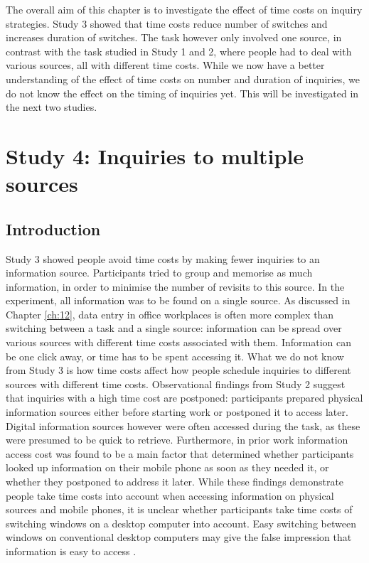 The overall aim of this chapter is to investigate the effect of time costs on inquiry strategies. Study 3 showed that time costs reduce number of switches and increases duration of switches. The task however only involved one source, in contrast with the task studied in Study 1 and 2, where people had to deal with various sources, all with different time costs. While we now have a better understanding of the effect of time costs on number and duration of inquiries, we do not know the effect on the timing of inquiries yet. This will be investigated in the next two studies.


\section{Study 4: Inquiries to multiple sources}
 
\subsection{Introduction}
Study 3 showed people avoid time costs by making fewer inquiries to an information source. Participants tried to group and memorise as much information, in order to minimise the number of revisits to this source. In the experiment, all information was to be found on a single source. As discussed in Chapter \ref{ch:12}, data entry in office workplaces is often more complex than switching between a task and a single source: information can be spread over various sources with different time costs associated with them. Information can be one click away, or time has to be spent accessing it. What we do not know from Study 3 is how time costs affect how people schedule inquiries to different sources with different time costs. Observational findings from Study 2 suggest that inquiries with a high time cost are postponed: participants prepared physical information sources either before starting work or postponed it to access later. Digital information sources however were often accessed during the task, as these were presumed to be quick to retrieve. Furthermore, in prior work \citep{Sohn2008} information access cost was found to be a main factor that determined whether participants looked up information on their mobile phone as soon as they needed it, or whether they postponed to address it later. While these findings demonstrate people take time costs into account when accessing information on physical sources and mobile phones, it is unclear whether participants take time costs of switching windows on a desktop computer into account. Easy switching between windows on conventional desktop computers may give the false impression that information is easy to access \citep{Sellen2003}. 


